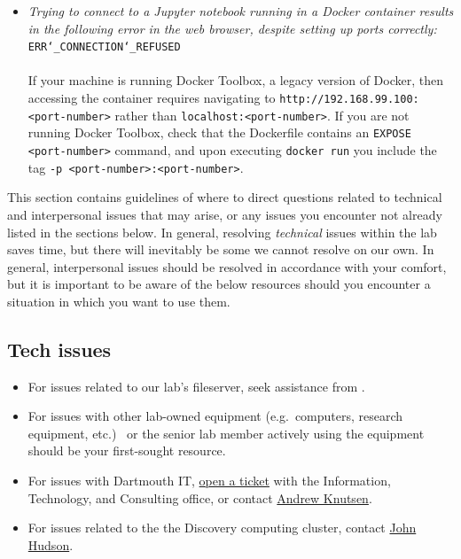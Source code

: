 \documentclass{tufte-book} %
\begin{document}
\begin{itemize}
\item \textit{Trying to connect to a Jupyter notebook running in a Docker container results in the following error in the web browser, despite setting up ports correctly: } \linebreak
{\tt ERR\char`_CONNECTION\char`_REFUSED}
\\~\\
If your machine is running Docker Toolbox, a legacy version of Docker, then accessing the container requires navigating to {\tt http://192.168.99.100:<port-number>} rather than {\tt localhost:<port-number>}. If you are not running Docker Toolbox, check that the Dockerfile contains an {\tt EXPOSE <port-number>} command, and upon executing {\tt docker run} you include the tag {\tt -p <port-number>:<port-number>}.

\end{itemize}


\noindent This section contains guidelines of where to direct questions related to technical and interpersonal issues that may arise, or any issues you encounter not already listed in the sections below. In general, resolving \textit{technical} issues within the lab saves time, but there will inevitably be some we cannot resolve on our own. In general, interpersonal issues should be resolved in accordance with your comfort, but it is important to be aware of the below resources should you encounter a situation in which you want to use them.

\subsection{Tech issues}
\begin{itemize}
\item For issues related to our lab's fileserver, seek assistance from \director.

\item For issues with other lab-owned equipment (e.g.~computers, research equipment, etc.) \coordinator~or the senior lab member actively using the equipment should be your first-sought resource.

\item For issues with Dartmouth IT, \href{help@dartmouth.edu}{open a ticket} with the Information, Technology, and Consulting office, or contact \href{mailto:Andrew.C.Knutsen@Dartmouth.edu}{Andrew Knutsen}.

\item For issues related to the the Discovery computing cluster, contact \href{mailto:John.P.Hudson@Dartmouth.edu}{John Hudson}.
\end{itemize}
\end{document}
